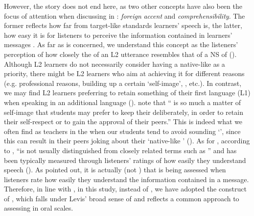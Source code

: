 \documentclass[output=paper]{langsci/langscibook}
\begin{document}
However, the story does not end here, as two other concepts have also been the focus of attention when discussing  in : \textit{foreign} \textit{accent} and \textit{comprehensibility}.  The former reflects how far from target-like standards learners’ speech is, the latter, how easy it is for listeners to perceive the information contained in learners’ messages \citep{Isaacs2010}. As far as  is concerned, we understand this concept as the listeners’ perception of how closely the  of an {L2} utterance resembles that of a NS of  (\citealt{MunroDerwing1995,MunroDerwing1999,DerwingMunro1997,DerwingMunro2009}). Although {L2} learners do not necessarily consider having a native-like  as a priority, there might be {L2} learners who aim at achieving it for different reasons (e.g. professional reasons, building up a certain ‘self-image’, , etc.). In contrast, we may find {L2} learners preferring to retain something of their first language (L1)  when speaking in an additional language (\citealt{PorterGarvin1989}). \citet[7]{DaltonSeidlhofer1994} note that “ is so much a matter of self-image that students may prefer to keep their  deliberately, in order to retain their self-respect or to gain the approval of their peers.” This is indeed what we often find as teachers in the  when our students tend to avoid sounding ‘’, since this can result in their peers joking about their ‘native-like ’ (\citealt{FisherEvans2000}). As for , according to \citet[252]{Levis2006},  “is not usually distinguished from closely related terms such as ” and has been typically measured through listeners’ ratings of how easily they understand speech (\citealt{MunroDerwing1999}). As \citet{IsaacsTrofimovich2012} pointed out, it is actually  (not ) that is being assessed when listeners rate how easily they understand the information contained in a message. Therefore, in line with \citet{TrofimovichIsaacs2012}, in this study, instead of , we have adopted the construct of , which falls under Levis’ broad sense of  and reflects a common approach to assessing  in oral  scales.
\end{document}
